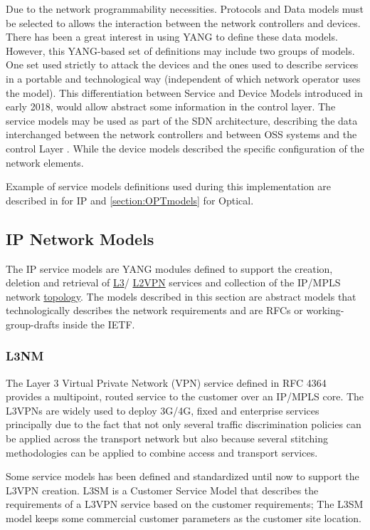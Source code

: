 \documentclass[a4paper,fleqn]{cas-dc}
\begin{document}
Due to the network programmability necessities. Protocols and Data models must be selected to allows the interaction between the network controllers and devices. There has been a great interest in using YANG to define these data models. However, this YANG-based set of definitions may include two groups of models. One set used strictly to attack the devices and the ones used to describe services in a portable and technological way (independent of which network operator uses the model). 
This differentiation between Service and Device Models introduced in early 2018, would allow abstract some information in the control layer. The service models may be used as part of the SDN architecture, describing the data interchanged between the network controllers and between OSS systems and the control Layer \cite{wu2017service}. While the device models described the specific configuration of the network elements. 

Example of service models definitions used during this implementation are described in  for IP and \cref{section:OPTmodels} for Optical.

\subsection{IP Network Models}
\label{section:IPmodels}

The IP service models are YANG modules defined to support the creation, deletion and retrieval of \hyperref[section:l3nm]{L3}/ \hyperref[section:l2nm]{L2VPN} services and collection of the IP/MPLS network \hyperref[subsection:IPtopo]{topology}. The models described in this section are abstract models that technologically describes the network requirements and are RFCs or working-group-drafts inside the IETF.

\subsubsection{L3NM}
\label{section:l3nm}
The Layer 3 Virtual Private Network (VPN) service defined in RFC 4364 \cite{rosen2006rfc} provides a multipoint, routed service to the customer over an IP/MPLS core. The L3VPNs are widely used to deploy 3G/4G, fixed and enterprise services principally due to the fact that not only several traffic discrimination policies can be applied across the transport network but also because several stitching methodologies can be applied to combine access and transport services. 

Some service models has been defined and standardized until now to support the L3VPN creation. L3SM \cite{rfc8299} is a Customer Service Model that describes the requirements of a L3VPN service based on the customer requirements; The L3SM model keeps some commercial customer parameters as the customer site location.
\end{document}
